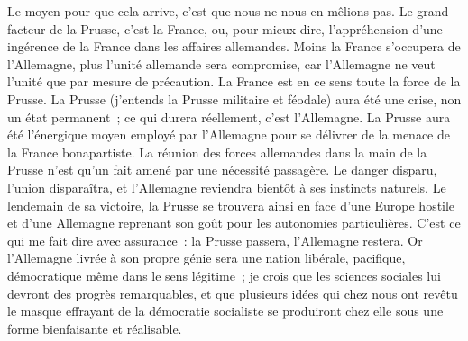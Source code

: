 \documentclass[french,twoside]{book} %
\begin{document}
Le moyen pour que cela arrive, c’est que nous ne nous en mêlions pas. Le grand facteur de la Prusse, c’est la France, ou, pour mieux dire, l’appréhension d’une ingérence de la France dans les affaires allemandes. Moins la France s’occupera de l’Allemagne, plus l’unité allemande sera compromise, car l’Allemagne ne veut l’unité que par mesure de précaution. La France est en ce sens toute la force de la Prusse. La Prusse (j’entends la Prusse militaire et féodale) aura été une crise, non un état permanent ; ce qui durera réellement, c’est l’Allemagne. La Prusse aura été l’énergique moyen employé par l’Allemagne pour se délivrer de la menace de la France bonapartiste. La réunion des forces allemandes dans la main de la Prusse n’est qu’un fait amené par une nécessité passagère. Le danger disparu, l’union disparaîtra, et l’Allemagne reviendra bientôt à ses instincts naturels. Le lendemain de sa victoire, la Prusse se trouvera ainsi en face d’une Europe hostile et d’une Allemagne reprenant son goût pour les autonomies particulières. C’est ce qui me fait dire avec assurance : la Prusse passera, l’Allemagne restera. Or l’Allemagne livrée à son propre génie sera une nation libérale, pacifique, démocratique même dans le sens légitime ; je crois que les sciences sociales lui devront des progrès remarquables, et que plusieurs idées qui chez nous ont revêtu le masque effrayant de la démocratie socialiste se produiront chez elle sous une forme bienfaisante et réalisable.\par
\end{document}

